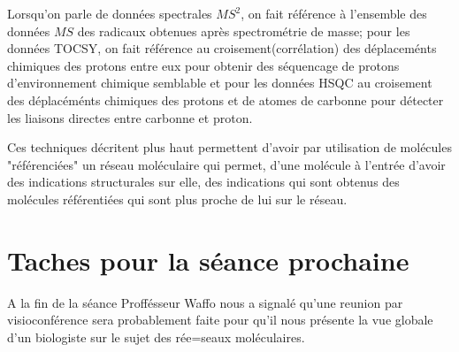 \documentclass[12pt, french, latin.medieval, a4paper]{report}
\begin{document}
    Lorsqu'on parle de données spectrales $MS^{2}$, on fait référence à l'ensemble des données $MS$ des radicaux obtenues après spectrométrie de masse; pour les données TOCSY, on fait référence au croisement(corrélation) des déplaceménts chimiques des protons entre eux pour obtenir des séquencage de protons d'environnement chimique semblable et pour les données HSQC au croisement des déplacéménts chimiques des protons et de atomes de carbonne pour détecter les liaisons directes entre carbonne et proton.

    Ces techniques décritent plus haut permettent d'avoir par utilisation de molécules "référenciées" un réseau moléculaire qui permet, d'une molécule à l'entrée d'avoir des indications structurales sur elle, des indications qui sont obtenus des molécules référentiées qui sont plus proche de lui sur le réseau.
    
    \section{Taches pour la séance prochaine}
    A la fin de la séance Proffésseur Waffo nous a signalé qu'une reunion par visioconférence sera probablement faite pour qu'il nous présente la vue globale d'un biologiste sur le sujet des rée=seaux moléculaires.
\end{document}
